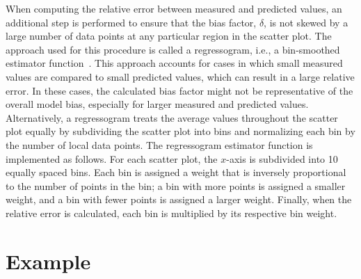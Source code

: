 When computing the relative error between measured and predicted values, an additional step is performed to ensure that the bias factor, $\delta$, is not skewed by a large number of data points at any particular region in the scatter plot. The approach used for this procedure is called a regressogram, i.e., a bin-smoothed estimator function~\cite{Tukey:1}. This approach accounts for cases in which small measured values are compared to small predicted values, which can result in a large relative error. In these cases, the calculated bias factor might not be representative of the overall model bias, especially for larger measured and predicted values. Alternatively, a regressogram treats the average values throughout the scatter plot equally by subdividing the scatter plot into bins and normalizing each bin by the number of local data points. The regressogram estimator function is implemented as follows. For each scatter plot, the $x$-axis is subdivided into 10 equally spaced bins. Each bin is assigned a weight that is inversely proportional to the number of points in the bin; a bin with more points is assigned a smaller weight, and a bin with fewer points is assigned a larger weight. Finally, when the relative error is calculated, each bin is multiplied by its respective bin weight.



\section{Example}

